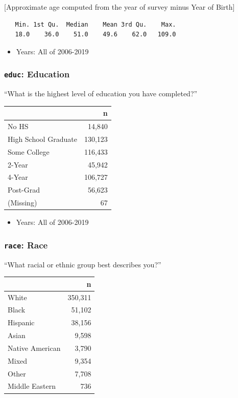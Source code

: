\documentclass[10pt,article,oneside]{memoir}
\theoremstyle{definition}
\begin{document}
{[}Approximate age computed from the year of survey minus Year of
Birth{]}

\begin{verbatim}
   Min. 1st Qu.  Median    Mean 3rd Qu.    Max. 
   18.0    36.0    51.0    49.6    62.0   109.0 
\end{verbatim}

\begin{itemize}
\tightlist
\item
  Years: All of 2006-2019
\end{itemize}

\hypertarget{educ-education}{%
\subsubsection{\texorpdfstring{\texttt{educ}:
Education}{educ: Education}}\label{educ-education}}

``What is the highest level of education you have completed?''

\begin{table}[H]
\centering
\begin{tabular}{lr}
\toprule
 & n\\
\midrule
No HS & 14,840\\
High School Graduate & 130,123\\
Some College & 116,433\\
2-Year & 45,942\\
4-Year & 106,727\\
Post-Grad & 56,623\\
(Missing) & 67\\
\bottomrule
\end{tabular}
\end{table}

\begin{itemize}
\tightlist
\item
  Years: All of 2006-2019
\end{itemize}

\hypertarget{race-race}{%
\subsubsection{\texorpdfstring{\texttt{race}:
Race}{race: Race}}\label{race-race}}

``What racial or ethnic group best describes you?''

\begin{table}[H]
\centering
\begin{tabular}{lr}
\toprule
 & n\\
\midrule
White & 350,311\\
Black & 51,102\\
Hispanic & 38,156\\
Asian & 9,598\\
Native American & 3,790\\
Mixed & 9,354\\
Other & 7,708\\
Middle Eastern & 736\\
\bottomrule
\end{tabular}
\end{table}
\end{document}
